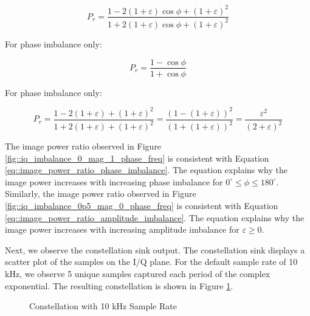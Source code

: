 \documentclass{article}
\begin{document}
\begin{equation}
	P_r = \frac{1-2(1+\varepsilon)\cos\phi+(1+\varepsilon)^2}{1+2(1+\varepsilon)\cos\phi+(1+\varepsilon)^2}
\end{equation}

For phase imbalance only:

\begin{equation}
	P_r = \frac{1-\cos\phi}{1+\cos\phi} \label{eq::image_power_ratio_phase_imbalance}
\end{equation}

For phase imbalance only:

\begin{equation}
	P_r = \frac{1-2(1+\varepsilon)+(1+\varepsilon)^2}{1+2(1+\varepsilon)+(1+\varepsilon)^2} = \frac{(1-(1+\varepsilon))^2}{(1+(1+\varepsilon))^2} = \frac{\varepsilon^2}{(2+\varepsilon)^2} \label{eq::image_power_ratio_amplitude_imbalance}
\end{equation}

The image power ratio observed in Figure \ref{fig::iq_imbalance_0_mag_1_phase_freq} is consistent with Equation \ref{eq::image_power_ratio_phase_imbalance}. The equation explains why the image power increases with increasing phase imbalance for $0^{\circ} \leq \phi \leq 180^{\circ}$. Similarly, the image power ratio observed in Figure \ref{fig::iq_imbalance_0p5_mag_0_phase_freq} is consistent with Equation \ref{eq::image_power_ratio_amplitude_imbalance}. The equation explains why the image power increases with increasing amplitude imbalance for $\varepsilon \geq 0$.

Next, we observe the constellation sink output. The constellation sink displays a scatter plot of the samples on the I/Q plane. For the default sample rate of 10 kHz, we observe 5 unique samples captured each period of the complex exponential. The resulting constellation is shown in Figure \ref{fig::iq_imbalance_0_mag_0_phase_10k_samp_rate_const}.
 
\begin{figure}[H]
	\centerline{}
	\caption{Constellation with 10 kHz Sample Rate}
	\label{fig::iq_imbalance_0_mag_0_phase_10k_samp_rate_const}
\end{figure}
\end{document}
